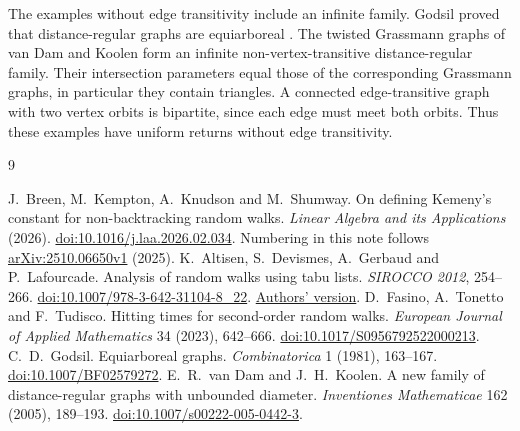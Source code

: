 \documentclass[11pt]{article}
\begin{document}
The examples without edge transitivity include an infinite family.
Godsil proved that distance-regular graphs are equiarboreal \cite{godsil}.
The twisted Grassmann graphs of van Dam and Koolen \cite{grassmann}
form an infinite non-vertex-transitive distance-regular family.
Their intersection parameters equal those of the corresponding
Grassmann graphs, in particular they contain triangles. A connected
edge-transitive graph with two vertex orbits is bipartite, since
each edge must meet both orbits. Thus these examples have uniform
returns without edge transitivity.

\begin{thebibliography}{9}\raggedright
{}
J.~Breen, M.~Kempton, A.~Knudson and M.~Shumway.
On defining Kemeny's constant for non-backtracking random walks.
\emph{Linear Algebra and its Applications} (2026).
\href{https://doi.org/10.1016/j.laa.2026.02.034}{doi:10.1016/j.laa.2026.02.034}.
Numbering in this note follows \href{https://arxiv.org/html/2510.06650v1}{arXiv:2510.06650v1} (2025).
K.~Altisen, S.~Devismes, A.~Gerbaud and P.~Lafourcade.
Analysis of random walks using tabu lists.
\emph{SIROCCO 2012}, 254--266.
\href{https://doi.org/10.1007/978-3-642-31104-8_22}{doi:10.1007/978-3-642-31104-8\_22}.
\href{https://www-verimag.imag.fr/PUBLIS/uploads/cizib1712.pdf}{Authors' version}.
D.~Fasino, A.~Tonetto and F.~Tudisco.
Hitting times for second-order random walks.
\emph{European Journal of Applied Mathematics} 34 (2023), 642--666.
\href{https://doi.org/10.1017/S0956792522000213}{doi:10.1017/S0956792522000213}.
C.~D.~Godsil. Equiarboreal graphs. \emph{Combinatorica} 1 (1981), 163--167.
\href{https://doi.org/10.1007/BF02579272}{doi:10.1007/BF02579272}.
E.~R.~van Dam and J.~H.~Koolen.
A new family of distance-regular graphs with unbounded diameter.
\emph{Inventiones Mathematicae} 162 (2005), 189--193.
\href{https://doi.org/10.1007/s00222-005-0442-3}{doi:10.1007/s00222-005-0442-3}.
\end{thebibliography}
\end{document}
